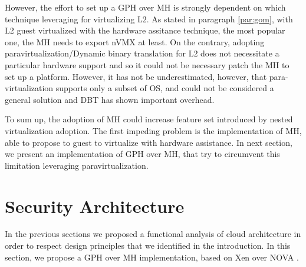 \documentclass{sig-alternate}
\begin{document}
However, the effort to set up a GPH over MH is strongly dependent on which technique leveraging for virtualizing L2. As stated in paragraph \ref{par:gom}, with L2 guest virtualized with the hardware assitance technique, the most popular one, the MH needs to export nVMX at least. 
On the contrary, adopting paravirtualization/Dynamic binary translation for L2 does not necessitate a particular hardware support and so it could not be necessary patch the MH to set up a platform. 
However, it has not be underestimated, however, that para-virtualization supports only a subset of OS, and could not be considered a general solution and DBT has shown important overhead.

To sum up,  the adoption of MH could  increase feature set introduced by nested virtualization adoption. The first impeding problem is the implementation of MH, able to propose to guest to virtualize with hardware assistance. In next section, we present an implementation of GPH over MH, that try to circumvent this limitation leveraging paravirtualization.

\section{Security Architecture}
\label{ref:arch}


In the previous sections we proposed a functional analysis of cloud architecture in order to respect design principles that we identified in the introduction. In this section, we propose a GPH over MH implementation, based on Xen over NOVA \cite{nova}.
\end{document}
